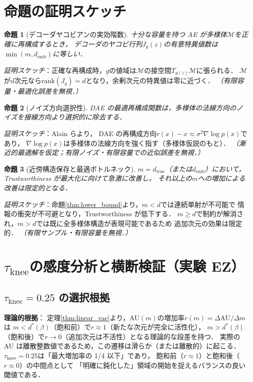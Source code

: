\documentclass[11pt,a4paper]{jsarticle}
\newtheorem{proposition}{命題}
\newcommand{\dtrue}{d_{\mathrm{true}}}
\newcommand{\Jg}{J_g}
\newcommand{\demb}{d_{\mathrm{emb}}}
\begin{document}
\section{命題の証明スケッチ}\label{app:proofs}

\begin{proposition}[デコーダヤコビアンの実効階数]\label{thm:rank}
十分な容量を持つ AE が多様体$\mathcal{M}$を正確に再構成するとき，
デコーダのヤコビ行列$\Jg(z)$の有意特異値数は$\min(m, \demb)$に等しい．
\end{proposition}
\textit{証明スケッチ}：正確な再構成時，$g$の値域は$\mathcal{M}$の接空間$T_{g(z)}\mathcal{M}$に張られる．
$\mathcal{M}$が$d$次元なら$\mathrm{rank}(\Jg) = d$となり，余剰次元の特異値は零に近づく．
\textit{（有限容量・最適化誤差を無視．）}

\begin{proposition}[ノイズ方向選択性]\label{thm:nsr}
DAE の最適再構成関数は，多様体の法線方向のノイズを接線方向より選択的に除去する．
\end{proposition}
\textit{証明スケッチ}：Alain ら\cite{alain2014dae}より，
DAE の再構成方向$r(x) - x \approx \sigma^2 \nabla\log p(x)$であり，
$\nabla\log p(x)$は多様体の法線方向を強く指す（多様体仮説のもと）．
\textit{（漸近的最適解を仮定；有限ノイズ・有限容量での近似誤差を無視．）}

\begin{proposition}[近傍構造保存と最適ボトルネック]\label{thm:trust}
$m = \dtrue$（または$\demb$）において，Trustworthiness が最大化に向けて急激に改善し，
それ以上の$m$への増加による改善は限定的となる．
\end{proposition}
\textit{証明スケッチ}：命題\ref{thm:lower_bound}より，$m < d$では連続単射が不可能で
情報の衝突が不可避となり，Trustworthiness が低下する．
$m \geq d$で制約が解消され，$m > d$では既に全多様体構造が表現可能であるため
追加次元の効果は限定的．
\textit{（有限サンプル・有限容量を無視．）}

\section{$\tau_{\mathrm{knee}}$の感度分析と横断検証（実験 EZ）}\label{app:tau_knee}

\subsection*{$\tau_{\mathrm{knee}} = 0.25$ の選択根拠}

\textbf{理論的根拠}：
定理\ref{thm:linear_vae}より，AU$(m)$の増加率$r(m) = \Delta\mathrm{AU}/\Delta m$は
$m < d^*(\beta)$（飽和前）で$r \approx 1$（新たな次元が完全に活性化），
$m > d^*(\beta)$（飽和後）で$r \to 0$（追加次元は不活性）となる理論的な段差を持つ．
実際の AU は離散整数値であるため，この遷移は滑らか（または離散的）に起こる．
$\tau_{\mathrm{knee}} = 0.25$は「最大増加率の 1/4 以下」であり，
飽和前（$r \approx 1$）と飽和後（$r \approx 0$）の中間点として
「明確に鈍化した」領域の開始を捉えるバランスの良い閾値である．
\end{document}
